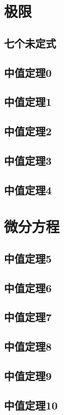 \documentclass[no-math]{lecture}
\begin{document}
	\raggedbottom
	\abovedisplayshortskip=4pt
	\belowdisplayshortskip=4pt
	\abovedisplayskip=4pt
	\belowdisplayskip=4pt
	\frontmatter
		\tableofcontents
	\mainmatter
	\chapter{极限}

	\newpage
	
	\newpage

	\section{七个未定式}
	\section{中值定理0}
	\section{中值定理1}
	\section{中值定理2}
\newpage
	\section{中值定理3}
	\section{中值定理4}
\newpage
	\chapter{微分方程}
	\section{中值定理5}
	\section{中值定理6}
\newpage
	\section{中值定理7}
	\section{中值定理8}
	\section{中值定理9}
	\section{中值定理10}
\par
\newpage
\end{document}
